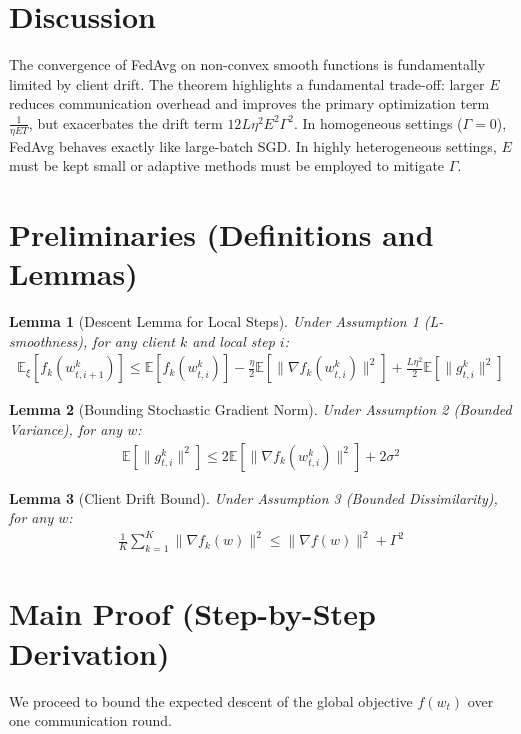 \documentclass{article}
\newtheorem{lemma}{Lemma}
\begin{document}
\section*{Discussion}
The convergence of FedAvg on non-convex smooth functions is fundamentally limited by client drift. The theorem highlights a fundamental trade-off: larger $E$ reduces communication overhead and improves the primary optimization term $\frac{1}{\eta E T}$, but exacerbates the drift term $12 L \eta^2 E^2 \Gamma^2$. In homogeneous settings ($\Gamma=0$), FedAvg behaves exactly like large-batch SGD. In highly heterogeneous settings, $E$ must be kept small or adaptive methods must be employed to mitigate $\Gamma$.

\section*{Preliminaries (Definitions and Lemmas)}
\begin{lemma}[Descent Lemma for Local Steps]
Under Assumption 1 (L-smoothness), for any client $k$ and local step $i$:
\begin{align*}
    \mathbb{E}_{\xi}[f_k(w_{t,i+1}^k)] \leq \mathbb{E}[f_k(w_{t,i}^k)] - \frac{\eta}{2} \mathbb{E}[\|\nabla f_k(w_{t,i}^k)\|^2] + \frac{L \eta^2}{2} \mathbb{E}[\|g_{t,i}^k\|^2]
\end{align*}
\end{lemma}

\begin{lemma}[Bounding Stochastic Gradient Norm]
Under Assumption 2 (Bounded Variance), for any $w$:
\begin{align*}
    \mathbb{E}[\|g_{t,i}^k\|^2] \leq 2 \mathbb{E}[\|\nabla f_k(w_{t,i}^k)\|^2] + 2\sigma^2
\end{align*}
\end{lemma}

\begin{lemma}[Client Drift Bound]
Under Assumption 3 (Bounded Dissimilarity), for any $w$:
\begin{align*}
    \frac{1}{K} \sum_{k=1}^K \|\nabla f_k(w)\|^2 \leq \|\nabla f(w)\|^2 + \Gamma^2
\end{align*}
\end{lemma}

\section*{Main Proof (Step-by-Step Derivation)}
We proceed to bound the expected descent of the global objective $f(w_t)$ over one communication round.
\end{document}
